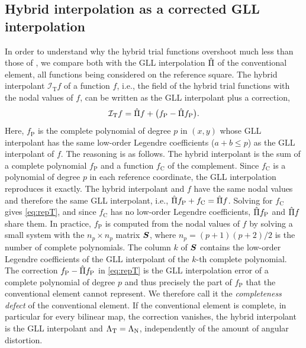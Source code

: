 \subsection{Hybrid interpolation as a corrected GLL interpolation}
\label{sec:hybrid-representation}
%
In order to understand why the hybrid trial functions overshoot much less than those of \PM, we compare both with the GLL interpolation $\hat\Pi$ of the conventional element, all functions being considered on the reference square. The hybrid interpolant $\mathcal I_{\mathrm{T}}f$ of a function $f$, i.e., the field of the hybrid trial functions with the nodal values of $f$, can be written as the GLL interpolant plus a correction,
%
\begin{equation}
  \mathcal I_{\mathrm{T}}f=\hat\Pi f+\bigl(f_{\mathrm{P}}-\hat\Pi f_{\mathrm{P}}\bigr) .
  \label{eq:repT}
\end{equation}
%
Here, $f_{\mathrm{P}}$ is the complete polynomial of degree $p$ in $(x,y)$ whose GLL interpolant has the same low-order Legendre coefficients ($a+b\le p$) as the GLL interpolant of $f$. The reasoning is as follows. The hybrid interpolant is the sum of a complete polynomial $f_{\mathrm{P}}$ and a function $f_{\mathrm{C}}$ of the complement. Since $f_{\mathrm{C}}$ is a polynomial of degree $p$ in each reference coordinate, the GLL interpolation reproduces it exactly. The hybrid interpolant and $f$ have the same nodal values and therefore the same GLL interpolant, i.e., $\hat\Pi f_{\mathrm{P}}+f_{\mathrm{C}}=\hat\Pi f$. Solving for $f_{\mathrm{C}}$ gives \cref{eq:repT}, and since $f_{\mathrm{C}}$ has no low-order Legendre coefficients, $\hat\Pi f_{\mathrm{P}}$ and $\hat\Pi f$ share them. In practice, $f_{\mathrm{P}}$ is computed from the nodal values of $f$ by solving a small system with the $n_p\times n_p$ matrix $\bm{S}$, where $n_p=(p+1)(p+2)/2$ is the number of complete polynomials. The column $k$ of $\bm{S}$ contains the low-order Legendre coefficients of the GLL interpolant of the $k$-th complete polynomial. The correction $f_{\mathrm{P}}-\hat\Pi f_{\mathrm{P}}$ in \cref{eq:repT} is the GLL interpolation error of a complete polynomial of degree $p$ and thus precisely the part of $f_{\mathrm{P}}$ that the conventional element cannot represent. We therefore call it the \emph{completeness defect} of the conventional element. If the conventional element is complete, in particular for every bilinear map, the correction vanishes, the hybrid interpolant is the GLL interpolant and $\Lambda_{\mathrm{T}}=\Lambda_{\mathrm{N}}$, independently of the amount of angular distortion.


